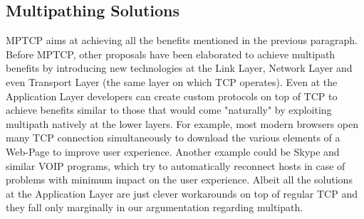 \subsection{Multipathing Solutions}
\vspace{5mm}
MPTCP aims at achieving all the benefits mentioned in the previous paragraph. Before MPTCP, other proposals have been elaborated to achieve multipath benefits by introducing new technologies at the Link Layer, Network Layer and even Transport Layer (the same layer on which TCP operates). Even at the Application Layer developers can create custom protocols on top of TCP to achieve benefits similar to those that would come "naturally" by exploiting multipath natively at the lower layers. 
For example, most modern browsers open many TCP connection simultaneously to download the various elements of a Web-Page to improve user experience. Another example could be Skype and similar VOIP programs, which try to automatically reconnect hosts in case of problems with minimum impact on the user experience. Albeit all the solutions at the Application Layer are just clever workarounds on top of regular TCP and they fall only marginally in our argumentation regarding multipath.

